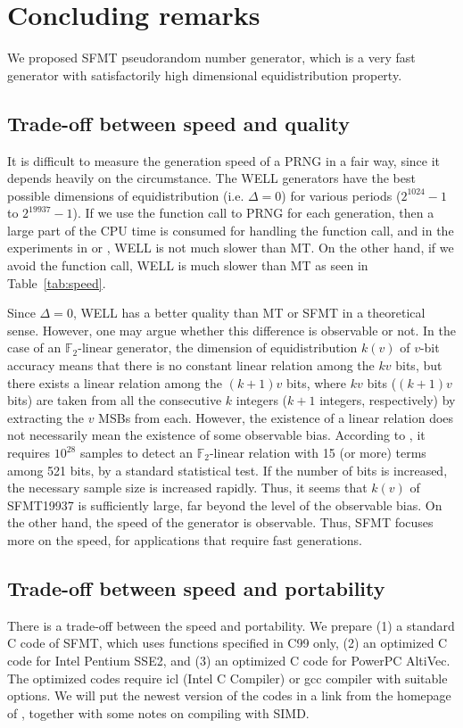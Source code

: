 \documentclass{svmult}
\def\F2{{\mathbb F}_2}
\begin{document}
\section{Concluding remarks}
We proposed SFMT pseudorandom number generator, 
which is a very fast generator with satisfactorily
high dimensional equidistribution property. 

\subsection{Trade-off between speed and quality}
It is difficult to measure the generation speed of a PRNG in a fair way,
since it depends heavily on the circumstance. 
The 
WELL \cite{WELL} generators have the best possible dimensions of 
equidistribution (i.e. $\Delta=0$)
for various periods ($2^{1024}-1$ to $2^{19937}-1$).
If we use the function call to PRNG
for each generation, then a large part of the CPU time
is consumed for handling the function call, and in the 
experiments in \cite{WELL} or \cite{XORSHIFT}, WELL 
is not much slower than MT. On the other hand, if we avoid
the function call, WELL is much slower than MT as seen
in Table~\ref{tab:speed}. 

Since $\Delta=0$, WELL has a better quality than MT or SFMT
in a theoretical sense. 
However, one may argue whether this difference is 
observable or not. In the case of an $\F2$-linear generator,
the dimension of equidistribution $k(v)$ of $v$-bit accuracy
means that
there is no constant linear relation among the 
$kv$ bits, but there exists a linear relation among
the $(k+1)v$ bits, where $kv$ bits 
($(k+1)v$ bits) are taken from
all the consecutive $k$ integers 
($k+1$ integers, respectively)
by extracting the $v$ MSBs from each.
However, the existence of a linear relation does not necessarily
mean the existence of some observable bias.
According to \cite{TESTWEIGHT}, it requires $10^{28}$
samples to detect an $\F2$-linear relation with 
15 (or more) terms among 521 bits, by a standard
statistical test. If the number of 
bits is increased, 
the necessary sample size is increased rapidly. Thus, it seems
that $k(v)$ of SFMT19937 is sufficiently large, far beyond
the level of the observable bias. 
On the other hand, the speed of the generator is 
observable.
Thus, SFMT focuses more on the speed, for applications
that require fast generations. 

\subsection{Trade-off between speed and portability}\label{sec:portability}
There is a trade-off between the speed and portability.
We prepare (1) a standard C code of SFMT, which uses 
functions specified in C99 only, (2) an optimized C code for
Intel Pentium SSE2, and 
(3) an optimized C code for PowerPC AltiVec. The optimized codes require
icl (Intel C Compiler) or gcc compiler with suitable options.
We will put the newest version of the codes 
in a link from the homepage of \cite{MT}, together with some notes 
on compiling with SIMD.
\end{document}

